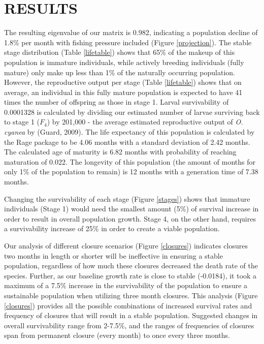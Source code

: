 \documentclass[
]{article}
\begin{document}
\hypertarget{results}{%
\section{RESULTS}\label{results}}

The resulting eigenvalue of our matrix is 0.982, indicating a population decline of 1.8\% per month with fishing pressure included (Figure \ref{projection}). The stable stage distribution (Table \ref{lifetable}) shows that 65\% of the makeup of this population is immature individuals, while actively breeding individuals (fully mature) only make up less than 1\% of the naturally occurring population. However, the reproductive output per stage (Table \ref{lifetable}) shows that on average, an individual in this fully mature population is expected to have 41 times the number of offspring as those in stage 1. Larval survivability of 0.0001328 is calculated by dividing our estimated number of larvae surviving back to stage 1 (\(F_4\)) by 201,000 - the average estimated reproductive output of \emph{O. cyanea} by (Guard, 2009). The life expectancy of this population is calculated by the Rage package to be 4.06 months with a standard deviation of 2.42 months. The calculated age of maturity is 6.82 months with probability of reaching maturation of 0.022. The longevity of this population (the amount of months for only 1\% of the population to remain) is 12 months with a generation time of 7.38 months.

Changing the survivability of each stage (Figure \ref{stages}) shows that immature individuals (Stage 1) would need the smallest amount (5\%) of survival increase in order to result in overall population growth. Stage 4, on the other hand, requires a survivability increase of 25\% in order to create a viable population.

Our analysis of different closure scenarios (Figure \ref{closures}) indicates closures two months in length or shorter will be ineffective in ensuring a stable population, regardless of how much these closures decreased the death rate of the species. Further, as our baseline growth rate is close to stable (-0.0184), it took a maximum of a 7.5\% increase in the survivability of the population to ensure a sustainable population when utilizing three month closures. This analysis (Figure \ref{closures}) provides all the possible combinations of increased survival rates and frequency of closures that will result in a stable population. Suggested changes in overall survivability range from 2-7.5\%, and the ranges of frequencies of closures span from permanent closure (every month) to once every three months.
\end{document}
